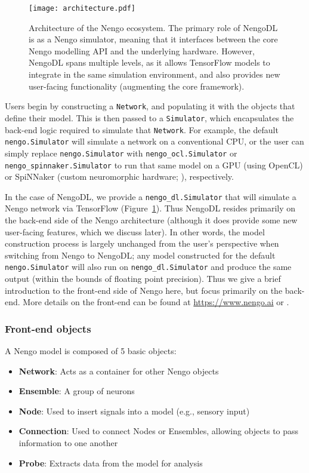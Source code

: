 \documentclass{article}
\begin{document}
\begin{figure}
\centering
\texttt{[image: architecture.pdf]}
\caption{Architecture of the Nengo ecosystem.  The primary role of NengoDL is as a Nengo simulator, meaning that it interfaces between the core Nengo modelling API and the underlying hardware.  However, NengoDL spans multiple levels, as it allows TensorFlow models to integrate in the same simulation environment, and also provides new user-facing functionality (augmenting the core framework).}
\label{fig:architecture}
\end{figure}

Users begin by constructing a \texttt{Network}, and populating it with the objects that define their model.  This is then passed to a \texttt{Simulator}, which encapsulates the back-end logic required to simulate that \texttt{Network}.  For example, the default \texttt{nengo.Simulator} will simulate a network on a conventional CPU, or the user can simply replace \texttt{nengo.Simulator} with \texttt{nengo\_ocl.Simulator} or \texttt{nengo\_spinnaker.Simulator} to run that same model on a GPU (using OpenCL) or SpiNNaker (custom neuromorphic hardware; \citealt{Khan2008}), respectively.  

In the case of NengoDL, we provide a \texttt{nengo\_dl.Simulator} that will simulate a Nengo network via TensorFlow (Figure~\ref{fig:architecture}).  Thus NengoDL resides primarily on the back-end side of the Nengo architecture (although it does provide some new user-facing features, which we discuss later).  In other words, the model construction process is largely unchanged from the user's perspective when switching from Nengo to NengoDL; any model constructed for the default \texttt{nengo.Simulator} will also run on \texttt{nengo\_dl.Simulator} and produce the same output (within the bounds of floating point precision).  Thus we give a brief introduction to the front-end side of Nengo here, but focus primarily on the back-end.  More details on the front-end can be found at \url{https://www.nengo.ai} or \citet{Bekolay2014}.

\subsubsection{Front-end objects}

A Nengo model is composed of 5 basic objects:

\begin{itemize}
\item {\bf Network}: Acts as a container for other Nengo objects
\item {\bf Ensemble}: A group of neurons
\item {\bf Node}: Used to insert signals into a model (e.g., sensory input)
\item {\bf Connection}: Used to connect Nodes or Ensembles, allowing objects to pass information to one another
\item {\bf Probe}: Extracts data from the model for analysis
\end{itemize}
\end{document}
